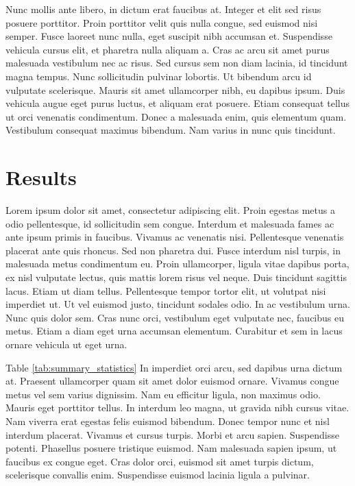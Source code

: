 \documentclass[12pt]{article}
\begin{document}
Nunc mollis ante libero, in dictum erat faucibus at. Integer et elit sed risus posuere porttitor. Proin porttitor velit quis nulla congue, sed euismod nisi semper. Fusce laoreet nunc nulla, eget suscipit nibh accumsan et. Suspendisse vehicula cursus elit, et pharetra nulla aliquam a. Cras ac arcu sit amet purus malesuada vestibulum nec ac risus. Sed cursus sem non diam lacinia, id tincidunt magna tempus. Nunc sollicitudin pulvinar lobortis. Ut bibendum arcu id vulputate scelerisque. Mauris sit amet ullamcorper nibh, eu dapibus ipsum. Duis vehicula augue eget purus luctus, et aliquam erat posuere. Etiam consequat tellus ut orci venenatis condimentum. Donec a malesuada enim, quis elementum quam. Vestibulum consequat maximus bibendum. Nam varius in nunc quis tincidunt.

\section{Results \label{sec:results}}

Lorem ipsum dolor sit amet, consectetur adipiscing elit. Proin egestas metus a odio pellentesque, id sollicitudin sem congue. Interdum et malesuada fames ac ante ipsum primis in faucibus. Vivamus ac venenatis nisi. Pellentesque venenatis placerat ante quis rhoncus. Sed non pharetra dui. Fusce interdum nisl turpis, in malesuada metus condimentum eu. Proin ullamcorper, ligula vitae dapibus porta, ex nisl vulputate lectus, quis mattis lorem risus vel neque. Duis tincidunt sagittis lacus. Etiam ut diam tellus. Pellentesque tempor tortor elit, ut volutpat nisi imperdiet ut. Ut vel euismod justo, tincidunt sodales odio. In ac vestibulum urna. Nunc quis dolor sem. Cras nunc orci, vestibulum eget vulputate nec, faucibus eu metus. Etiam a diam eget urna accumsan elementum. Curabitur et sem in lacus ornare vehicula ut eget urna.




Table \ref{tab:summary_statistics} In imperdiet orci arcu, sed dapibus urna dictum at. Praesent ullamcorper quam sit amet dolor euismod ornare. Vivamus congue metus vel sem varius dignissim. Nam eu efficitur ligula, non maximus odio. Mauris eget porttitor tellus. In interdum leo magna, ut gravida nibh cursus vitae. Nam viverra erat egestas felis euismod bibendum. Donec tempor nunc et nisl interdum placerat. Vivamus et cursus turpis. Morbi et arcu sapien. Suspendisse potenti. Phasellus posuere tristique euismod. Nam malesuada sapien ipsum, ut faucibus ex congue eget. Cras dolor orci, euismod sit amet turpis dictum, scelerisque convallis enim. Suspendisse euismod lacinia ligula a pulvinar.
\end{document}
